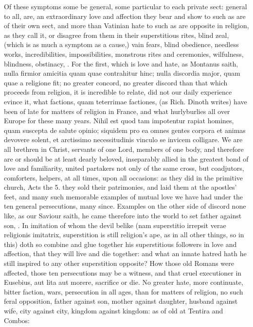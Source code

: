 {Of these symptoms some be general, some particular to each private
sect: general to all, are, an extraordinary love and affection they
bear and show to such as are of their own sect, and more than Vatinian
hate to such as are opposite in religion, as they call it, or disagree
from them in their superstitious rites, blind zeal, (which is as much a
symptom as a cause,) vain fears, blind obedience, needless works,
incredibilities, impossibilities, monstrous rites and ceremonies,
wilfulness, blindness, obstinacy, \etc{}. For the first, which is love and
hate, as Montanus saith, nulla firmior amicitia quam quae
contrahitur hinc; nulla discordia major, quam quae a religione fit; no
greater concord, no greater discord than that which proceeds from
religion, it is incredible to relate, did not our daily experience
evince it, what factions, quam teterrimae factiones, (as Rich.
Dinoth writes) have been of late for matters of religion in France, and
what hurlyburlies all over Europe for these many years. Nihil est quod
tam impotentur rapiat homines, quam suscepta de salute opinio; siquidem
pro ea omnes gentes corpora et animas devovere solent, et arctissimo
necessitudinis vinculo se invicem colligare. We are all brethren in
Christ, servants of one Lord, members of one body, and therefore are or
should be at least dearly beloved, inseparably allied in the greatest
bond of love and familiarity, united partakers not only of the same
cross, but coadjutors, comforters, helpers, at all times, upon all
occasions: as they did in the primitive church, Acts the 5. they sold
their patrimonies, and laid them at the apostles' feet, and many such
memorable examples of mutual love we have had under the ten general
persecutions, many since. Examples on the other side of discord none
like, as our Saviour saith, he came therefore into the world to set
father against son, \etc{}. In imitation of whom the devil belike
(nam superstitio irrepsit verae religionis imitatrix,
superstition is still religion's ape, as in all other things, so in
this) doth so combine and glue together his superstitious followers in
love and affection, that they will live and die together: and what an
innate hatred hath he still inspired to any other superstition
opposite? How those old Romans were affected, those ten persecutions
may be a witness, and that cruel executioner in Eusebius, aut lita aut
morere, sacrifice or die. No greater hate, more continuate, bitter
faction, wars, persecution in all ages, than for matters of religion,
no such feral opposition, father against son, mother against daughter,
husband against wife, city against city, kingdom against kingdom: as of
old at Tentira and Combos:

}
